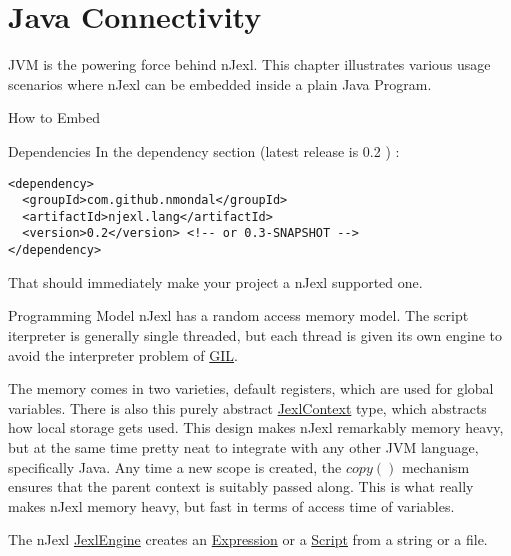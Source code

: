 \chapter{Java Connectivity}\label{java-connectivity}

{\LARGE J}VM is the powering force behind nJexl.
This chapter illustrates various usage scenarios where nJexl can be
embedded inside a plain Java Program.

\begin{section}{How to Embed}

\begin{subsection}{Dependencies}
In the dependency section (latest release is 0.2 ) : 
\begin{lstlisting}[style=XmlStyle]
<dependency>
  <groupId>com.github.nmondal</groupId>
  <artifactId>njexl.lang</artifactId>
  <version>0.2</version> <!-- or 0.3-SNAPSHOT -->
</dependency>
\end{lstlisting}
That should immediately make your project a nJexl supported one. 
\end{subsection}

\begin{subsection}{Programming Model}
nJexl has a random access memory model.
The script iterpreter is generally single threaded,
but each thread is given its own engine to avoid
the interpreter problem of \href{https://en.wikipedia.org/wiki/Global\_interpreter\_lock}{GIL}.

The memory comes in two varieties, default registers, which are used for global variables.
There is also this purely abstract 
\href{https://github.com/nmondal/njexl/blob/master/lang/src/main/java/com/noga/njexl/lang/JexlContext.java}{JexlContext} type, 
which abstracts how local storage gets used. This design makes nJexl remarkably memory heavy,
but at the same time pretty neat to integrate with any other JVM language, specifically Java. 
Any time a new scope is created, the $copy()$ mechanism ensures that the parent context is suitably passed along.
This is what really makes nJexl memory heavy, but fast in terms of access time of variables.

The nJexl \href{https://github.com/nmondal/njexl/blob/master/lang/src/main/java/com/noga/njexl/lang/JexlEngine.java}{JexlEngine} 
creates an \href{https://github.com/nmondal/njexl/blob/master/lang/src/main/java/com/noga/njexl/lang/Expression.java}{Expression} 
or a \href{https://github.com/nmondal/njexl/blob/master/lang/src/main/java/com/noga/njexl/lang/Script.java}{Script} 
from a string or a file. 


\end{subsection}
\end{section}
